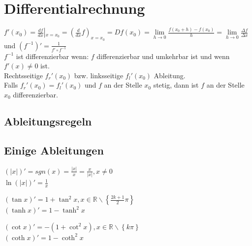\section{Differentialrechnung}
	$ f'(x_0) = \frac{df}{dx}\left|_{x=x_0}\right. = (\frac{d}{dx}f)_{x=x_0} = Df(x_0) = \lim\limits_{h \rightarrow 0} \frac{f(x_0+h) - f(x_0)}{h} = \lim\limits_{h \rightarrow 0} \frac{\Delta f}{\Delta x}$ und $ (f^{-1})' = \frac{1}{f' \circ f^{-1}}$\\
	$f^{-1}$ ist differenzierbar wenn: $f$ differenzierbar und umkehrbar ist und wenn $f'(x) \neq 0$ ist. \\
	Rechtsseitige $f_{r}'(x_0)$ bzw. linksseitige $f_{l}'(x_0)$ Ableitung.\\
	Falls $f_{r}'(x_0) = f_{l}'(x_0)$ und $f$ an der Stelle $x_0$ stetig, dann ist $f$ an der Stelle $x_0$ differenzierbar. 

\subsection{Ableitungsregeln}

\subsection{Einige Ableitungen}
	\begin{minipage}[t]{6cm} 		
		$(|x|)' = sgn(x) = \frac{|x|}{x} = \frac{x}{|x|}, x \neq 0$\\
		$\ln(|x|)' = \frac{1}{x}$
	\end{minipage} 
	\begin{minipage}[t]{6.5cm} 		
		$(\tan x)' = 1 + \tan^2{ }x , x \in \mathbb{R}\backslash \left\{ \frac{2k+1}{2}\pi \right\} $\\
		$(\tanh x)' = 1 - \tanh^2 x$ 
	\end{minipage} 
	\begin{minipage}[t]{6cm} 		
		$(\cot x)' = -(1 + \cot^2{ }x) , x \in \mathbb{R}\backslash \left\{ k\pi \right\} $\\
		$(\coth x)' = 1 - \coth ^2 x$
	\end{minipage} 

